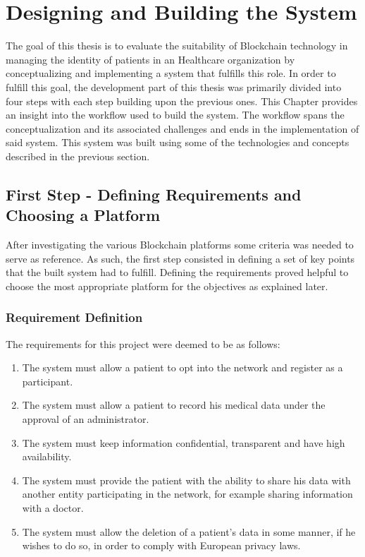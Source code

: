 \chapter{Designing and Building the System} \label{HLFHealthcare}  

The goal of this thesis is to evaluate the suitability of Blockchain technology
in managing the identity of patients in an Healthcare organization by
conceptualizing and implementing a system that fulfills this role. In order to
fulfill this goal, the development part of this thesis was primarily divided
into four steps with each step building upon the previous ones. This Chapter
provides an insight into the workflow used to build the system. The workflow
spans the conceptualization and its associated challenges and ends in the
implementation of said system. This system was built using some of the
technologies and concepts described in the previous section.

\section{First Step - Defining Requirements and Choosing a 
	Platform}\label{choosingHyperledger}

After investigating the various Blockchain platforms some criteria was needed
to serve as reference. As such, the first step consisted in defining a set of
key points that the built system had to fulfill. Defining the requirements
proved helpful to choose the most appropriate platform for the objectives as
explained later.

\subsection{Requirement Definition}
The requirements for this project were deemed to be as follows:

\renewcommand{\labelenumi}{\Roman{enumi}.}
\begin{enumerate}
  \item The system must allow a patient to opt into the network and register as
    a participant.
  \item The system must allow a patient to record his medical data under the
    approval of an administrator.
  \item The system must keep information confidential, transparent and have
    high availability.
  \item The system must provide the patient with the ability to share his data
    with another entity participating in the network, for example sharing
    information with a doctor.
  \item The system must allow the deletion of a patient's data in some manner,
    if he wishes to do so, in order to comply with European privacy laws.
\end{enumerate}

